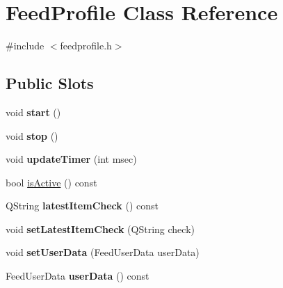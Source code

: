 \hypertarget{class_feed_profile}{\section{Feed\-Profile Class Reference}
\label{class_feed_profile}
}


{\ttfamily \#include $<$feedprofile.\-h$>$}

\subsection*{Public Slots}
\begin{DoxyCompactItemize}
\item 
\hypertarget{class_feed_profile_a8b8fdf5b10a87b1490e83d270ee64679}{void {\bfseries start} ()}\label{class_feed_profile_a8b8fdf5b10a87b1490e83d270ee64679}

\item 
\hypertarget{class_feed_profile_ab896856ca45d4302116556bae13c4b96}{void {\bfseries stop} ()}\label{class_feed_profile_ab896856ca45d4302116556bae13c4b96}

\item 
\hypertarget{class_feed_profile_acb763d854a488385ebf4109addfcec23}{void {\bfseries update\-Timer} (int msec)}\label{class_feed_profile_acb763d854a488385ebf4109addfcec23}

\item 
bool \hyperlink{class_feed_profile_a43feba0f4c42ac44b1fa3984398a4050}{is\-Active} () const 
\item 
\hypertarget{class_feed_profile_a71d0841369073527dbe4261a7c3b3710}{Q\-String {\bfseries latest\-Item\-Check} () const }\label{class_feed_profile_a71d0841369073527dbe4261a7c3b3710}

\item 
\hypertarget{class_feed_profile_a7f28dd717e5782841e1b2c6754ac17b8}{void {\bfseries set\-Latest\-Item\-Check} (Q\-String check)}\label{class_feed_profile_a7f28dd717e5782841e1b2c6754ac17b8}

\item 
\hypertarget{class_feed_profile_a3ea7736880adf78b960ec1e0107d3c9e}{void {\bfseries set\-User\-Data} (Feed\-User\-Data user\-Data)}\label{class_feed_profile_a3ea7736880adf78b960ec1e0107d3c9e}

\item 
\hypertarget{class_feed_profile_a26335dbbc5f1d24d5cf145d1d32b6d7e}{Feed\-User\-Data {\bfseries user\-Data} () const }\label{class_feed_profile_a26335dbbc5f1d24d5cf145d1d32b6d7e}

\end{DoxyCompactItemize}
